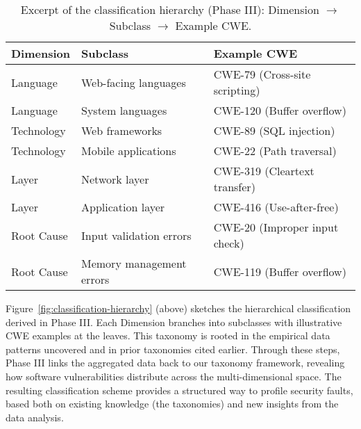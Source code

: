 \begin{table}[h!]
\centering
\caption{Excerpt of the classification hierarchy (Phase III): Dimension $\rightarrow$ Subclass $\rightarrow$ Example CWE.}
\label{tab:classification}
\begin{tabular}{lll}
\hline
\textbf{Dimension} & \textbf{Subclass} & \textbf{Example CWE} \\
\hline
Language & Web-facing languages & CWE-79 (Cross-site scripting) \\
Language & System languages & CWE-120 (Buffer overflow) \\
Technology & Web frameworks & CWE-89 (SQL injection) \\
Technology & Mobile applications & CWE-22 (Path traversal) \\
Layer & Network layer & CWE-319 (Cleartext transfer) \\
Layer & Application layer & CWE-416 (Use-after-free) \\
Root Cause & Input validation errors & CWE-20 (Improper input check) \\
Root Cause & Memory management errors & CWE-119 (Buffer overflow) \\
\hline
\end{tabular}
\end{table}

Figure~\ref{fig:classification-hierarchy} (above) sketches the hierarchical classification derived in Phase III. Each Dimension branches into subclasses with illustrative CWE examples at the leaves. This taxonomy is rooted in the empirical data patterns uncovered and in prior taxonomies cited earlier. Through these steps, Phase III links the aggregated data back to our taxonomy framework, revealing how software vulnerabilities distribute across the multi-dimensional space. The resulting classification scheme provides a structured way to profile security faults, based both on existing knowledge (the taxonomies) and new insights from the data analysis.